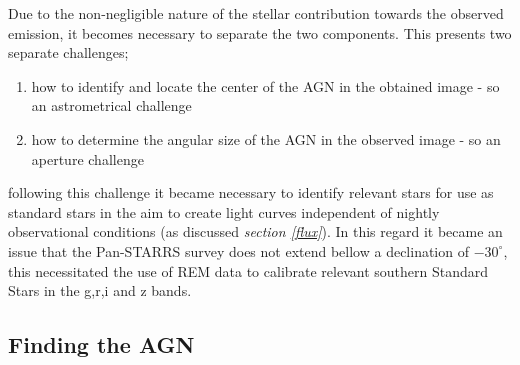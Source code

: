 \documentclass[a4paper, 12pt, twoside]{article}
\begin{document}
\noindent Due to the non-negligible nature of the stellar contribution towards the observed emission, it becomes necessary to separate the two components. This presents two separate challenges;
\begin{enumerate}
\item how to identify and locate the center of the AGN in the obtained image - so an astrometrical challenge
\item how to determine the angular size of the AGN in the observed image - so an aperture challenge
\end{enumerate}
following this challenge it became necessary to identify relevant stars for use as standard stars in the aim to create light curves independent of nightly observational conditions (as discussed \emph{section \ref{flux}}). In this regard it became an issue that the Pan-STARRS survey does not extend bellow a declination of $-30^\circ$, this necessitated the use of REM data to calibrate relevant southern Standard Stars in the g,r,i and z bands. 

\subsection{Finding the AGN}
\end{document}
